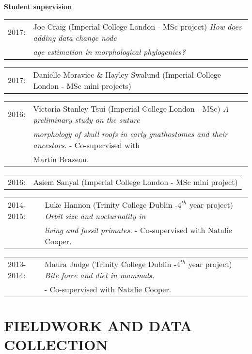 \documentclass[10pt,a4paper]{article}
\begin{document}
{\raggedright\textbf{Student supervision}\\[1.5ex]
\begin{tabular}{ll}
2017: & Joe Craig (Imperial College London - MSc project) \textit{How does adding data change node}\\
     & \textit{age estimation in morphological phylogenies?}\\
\end{tabular}
\begin{tabular}{ll}
2017: & Danielle Moraviec \& Hayley Swalund (Imperial College London - MSc mini projects)\\
\end{tabular}
\begin{tabular}{ll}
2016: & Victoria Stanley Tsui (Imperial College London - MSc) \textit{A preliminary study on the suture}\\
      & \textit{morphology of skull roofs in early gnathostomes and their ancestors.} - Co-supervised with\\
      & Martin Brazeau.\\
\end{tabular}
\begin{tabular}{ll}
2016: & Asiem Sanyal (Imperial College London - MSc mini project)\\
\end{tabular}
\begin{tabular}{ll}
2014-2015: & Luke Hannon (Trinity College Dublin -$4^{th}$ year project) \textit{Orbit size and nocturnality in}\\
      & \textit{living and fossil primates.} - Co-supervised with Natalie Cooper.\\
\end{tabular}
\begin{tabular}{ll}
2013-2014: & Maura Judge (Trinity College Dublin -$4^{th}$ year project) \textit{Bite force and diet in mammals.}\\
           &  - Co-supervised with Natalie Cooper.\\
\end{tabular}
\bigskip

\section{FIELDWORK AND DATA COLLECTION}

}
\end{document}
